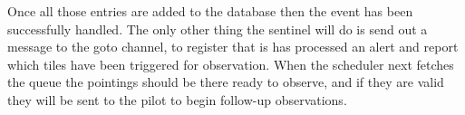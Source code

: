 \begin{colsection}
\begin{colsection}
Once all those entries are added to the database then the event has been successfully handled. The only other thing the sentinel will do is send out a  message to the \gls{goto} channel, to register that is has processed an alert and report which tiles have been triggered for observation. When the scheduler next fetches the queue the pointings should be there ready to observe, and if they are valid they will be sent to the pilot to begin follow-up observations.

\end{colsection}


\end{colsection}

